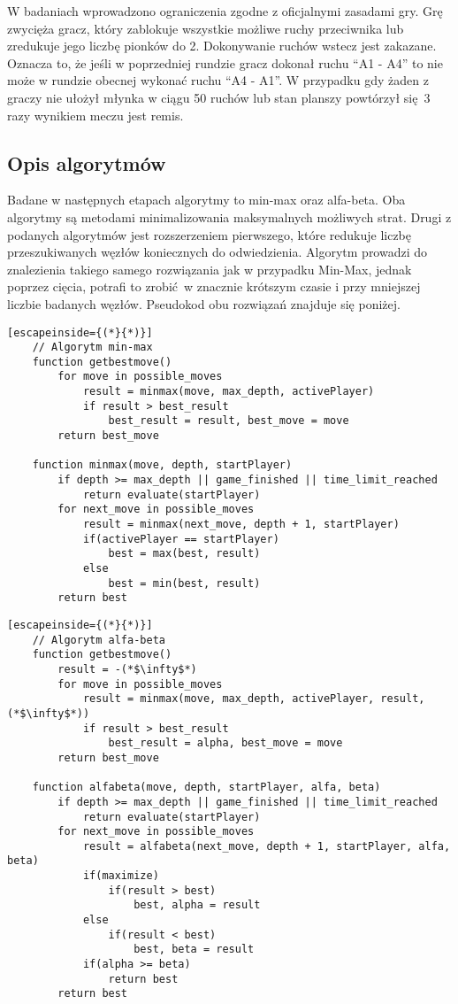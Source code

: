 \documentclass[a4paper,10pt]{article}
\begin{document}
    W badaniach wprowadzono ograniczenia zgodne z oficjalnymi zasadami gry. Grę zwycięża gracz, który zablokuje wszystkie możliwe ruchy przeciwnika lub zredukuje jego liczbę pionków do 2. Dokonywanie ruchów wstecz jest zakazane. Oznacza to, że jeśli w poprzedniej rundzie gracz dokonał ruchu ``A1 - A4'' to nie może w rundzie obecnej wykonać ruchu ``A4 - A1''. W przypadku gdy żaden z graczy nie ułożył młynka w ciągu 50 ruchów lub stan planszy powtórzył się 3 razy wynikiem meczu jest remis.
    
    \justify
    \subsection{Opis algorytmów}
    Badane w następnych etapach algorytmy to min-max oraz alfa-beta. Oba algorytmy są metodami minimalizowania maksymalnych możliwych strat. Drugi z podanych algorytmów jest rozszerzeniem pierwszego, które redukuje liczbę przeszukiwanych węzłów koniecznych do odwiedzienia. Algorytm prowadzi do znalezienia takiego samego rozwiązania jak w przypadku Min-Max, jednak poprzez cięcia, potrafi to zrobić w znacznie krótszym czasie i przy mniejszej liczbie badanych węzłów. Pseudokod obu rozwiązań znajduje się poniżej.
    
    \begin{lstlisting}[escapeinside={(*}{*)}]
    // Algorytm min-max
    function getbestmove()
        for move in possible_moves
            result = minmax(move, max_depth, activePlayer)
            if result > best_result
                best_result = result, best_move = move
        return best_move
        
    function minmax(move, depth, startPlayer)
        if depth >= max_depth || game_finished || time_limit_reached
            return evaluate(startPlayer)
        for next_move in possible_moves
            result = minmax(next_move, depth + 1, startPlayer)
            if(activePlayer == startPlayer)
                best = max(best, result)
            else
                best = min(best, result)
        return best
    \end{lstlisting}
    \newpage
    \begin{lstlisting}[escapeinside={(*}{*)}]
    // Algorytm alfa-beta
    function getbestmove()
        result = -(*$\infty$*)
        for move in possible_moves
            result = minmax(move, max_depth, activePlayer, result, (*$\infty$*))
            if result > best_result
                best_result = alpha, best_move = move
        return best_move
        
    function alfabeta(move, depth, startPlayer, alfa, beta)
        if depth >= max_depth || game_finished || time_limit_reached
            return evaluate(startPlayer)
        for next_move in possible_moves
            result = alfabeta(next_move, depth + 1, startPlayer, alfa, beta)
            if(maximize)
                if(result > best)
                    best, alpha = result
            else
                if(result < best)
                    best, beta = result
            if(alpha >= beta)
                return best
        return best
    \end{lstlisting}
    
\end{document}
